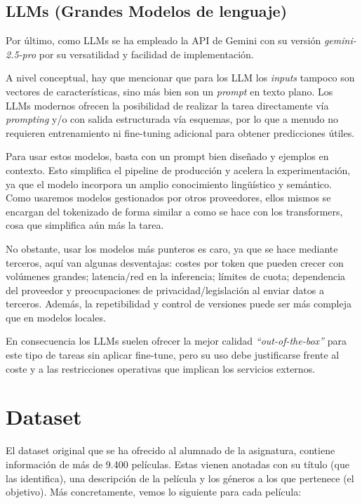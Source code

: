 \documentclass[11pt,spanish,listoffigures,listoftables]{tfgetsinf}
\begin{document}
\subsection{LLMs (Grandes Modelos de lenguaje)}
Por último, como LLMs se ha empleado la API de Gemini con su versión \textit{gemini-2.5-pro} por su versatilidad y facilidad de implementación.

A nivel conceptual, hay que mencionar que para los LLM los \textit{inputs} tampoco son vectores de características, sino más bien son un \textit{prompt} en texto plano. Los LLMs modernos ofrecen la posibilidad de realizar la tarea directamente vía \textit{prompting} \cite{liu-2021} y/o con salida estructurada vía esquemas, por lo que a menudo no requieren entrenamiento ni fine-tuning adicional para obtener predicciones útiles. 

Para usar estos modelos, basta con un prompt bien diseñado y ejemplos en contexto. Esto simplifica el pipeline de producción y acelera la experimentación, ya que el modelo incorpora un amplio conocimiento lingüístico y semántico. Como usaremos modelos gestionados por otros proveedores, ellos mismos se encargan del tokenizado de forma similar a como se hace con los transformers, cosa que simplifica aún más la tarea.

No obstante,  usar los modelos más punteros es caro, ya que se hace mediante terceros, aquí van algunas desventajas: costes por token que pueden crecer con volúmenes grandes; latencia/red en la inferencia; límites de cuota; dependencia del proveedor y preocupaciones de privacidad/legislación al enviar datos a terceros. Además, la repetibilidad y control de versiones puede ser más compleja que en modelos locales.

En consecuencia los LLMs suelen ofrecer la mejor calidad \textit{{``out-of-the-box''}} para este tipo de tareas sin aplicar fine-tune, pero su uso debe justificarse frente al coste y a las restricciones operativas que implican los servicios externos.

\section{Dataset}
El dataset original que se ha ofrecido al alumnado de la asignatura, contiene información de más de 9.400 películas. Estas vienen anotadas con su título (que las identifica), una descripción de la película y los géneros a los que pertenece (el objetivo). Más concretamente, vemos lo siguiente para cada película:
\end{document}
